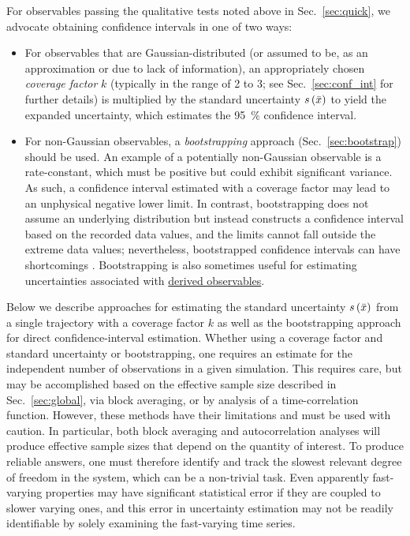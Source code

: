 For observables passing the qualitative tests noted above in Sec.\ \ref{sec:quick}, we advocate obtaining confidence intervals in one of two ways:
\begin{itemize}
\item For observables that are Gaussian-distributed (or assumed to be, as an approximation or due to lack of information), an appropriately chosen \emph{coverage factor} $k$ (typically in the range of 2 to 3; see Sec.~\ref{sec:conf_int} for further details) is multiplied by the standard uncertainty $s\left( \bar{x} \right)$ to yield the expanded uncertainty, which estimates the 95~\% confidence interval.
\item For non-Gaussian observables, a \emph{bootstrapping} approach (Sec.~\ref{sec:bootstrap}) should be used.
  An example of a potentially non-Gaussian observable is a rate-constant, which must be positive but could exhibit significant variance.  As such, a confidence interval estimated with a coverage factor may lead to an unphysical negative lower limit.
  In contrast, bootstrapping does not assume an underlying distribution but instead constructs a confidence interval based on the recorded data values, and the limits cannot fall outside the extreme data values;
  nevertheless, bootstrapped confidence intervals can have shortcomings \cite{Schenker1985,Chernick2009}.
  Bootstrapping is also sometimes useful for estimating uncertainties associated with \hyperref[def:deriv_obs]{derived observables}.
\end{itemize}

Below we describe approaches for estimating the standard uncertainty $s\left( \bar{x} \right)$ from a single trajectory with a coverage factor $k$ as well as the bootstrapping approach for direct confidence-interval estimation. Whether using a coverage factor and standard uncertainty or bootstrapping, one requires an estimate for the independent number of observations in a given simulation.  This requires care, but may be accomplished based on the effective sample size described in Sec.~\ref{sec:global}, via block averaging, or by analysis of a time-correlation function. However, these methods have their limitations and must be used with caution.  In particular, both block averaging and autocorrelation analyses will produce effective sample sizes that depend on the quantity of interest.  To produce reliable answers, one must therefore identify and track the slowest relevant degree of freedom in the system, which can be a non-trivial task.  Even apparently fast-varying properties may have significant statistical error if they are coupled to slower varying ones, and this error in uncertainty estimation may not be readily identifiable by solely examining the fast-varying time series.

